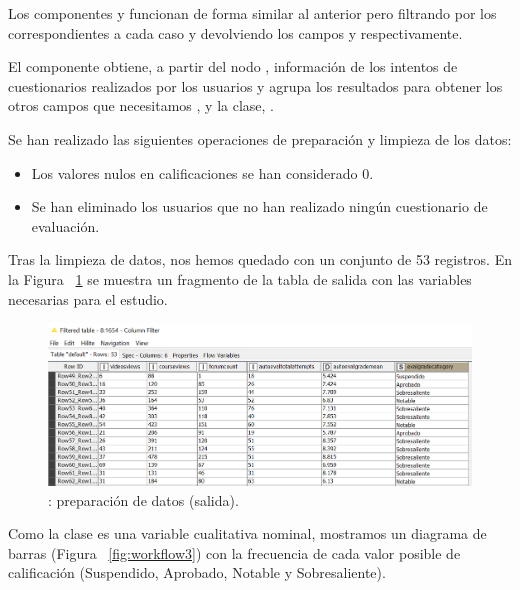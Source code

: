Los componentes  y  funcionan de forma similar al anterior pero filtrando por los  correspondientes a cada caso y 
devolviendo los campos  y  respectivamente. 

El componente  obtiene, a partir del nodo , información de los intentos de cuestionarios 
realizados por los usuarios y agrupa los resultados para obtener los otros campos que necesitamos ,  y la clase, .

Se han realizado las siguientes operaciones de preparación y limpieza de los datos: 

\begin{itemize}
	\item Los valores nulos en calificaciones se han considerado 0. 
	\item Se han eliminado los usuarios que no han realizado ningún cuestionario de evaluación.
\end{itemize}

Tras la limpieza de datos, nos hemos quedado con un conjunto de 53 registros. En la Figura ~\ref{fig:workflow2} se muestra un fragmento de la tabla de salida con las variables necesarias para el estudio. 

\begin{figure}[!htb]
	\centering
	\includegraphics[width=1\textwidth]{img/workflow2.png}
	\caption{: preparación de datos (salida).}
	\label{fig:workflow2}
\end{figure}
\FloatBarrier

Como la clase es una variable cualitativa nominal, mostramos un diagrama de barras (Figura ~\ref{fig:workflow3}) con la frecuencia de cada valor posible de calificación (Suspendido, Aprobado, Notable y Sobresaliente). 

